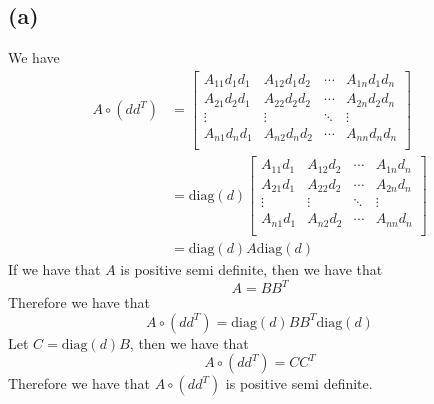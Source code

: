 \documentclass[11pt]{article}
\begin{document}
\subsection*{(a)}
We have 
\begin{align*}
    A \circ (dd^T) &= \begin{bmatrix}
        A_{11} d_1 d_1 & A_{12} d_1 d_2 & \cdots & A_{1n} d_1 d_n\\
        A_{21} d_2 d_1 & A_{22} d_2 d_2 & \cdots & A_{2n} d_2 d_n\\
        \vdots & \vdots & \ddots & \vdots\\
        A_{n1} d_n d_1 & A_{n2} d_n d_2 & \cdots & A_{nn} d_n d_n\\
    \end{bmatrix}\\
    & = \text{diag} (d) \begin{bmatrix}
        A_{11}d_1 & A_{12}d_2 & \cdots & A_{1n}d_n\\
        A_{21}d_1 & A_{22}d_2 & \cdots & A_{2n}d_n\\
        \vdots & \vdots & \ddots & \vdots\\
        A_{n1}d_1 & A_{n2}d_2 & \cdots & A_{nn}d_n\\
    \end{bmatrix}\\
    &= \text{diag} (d) A \text{diag}(d)
\end{align*}
If we have that $A$ is positive semi definite, then we have that 
$$A=BB^T$$
Therefore we have that 
$$A \circ (dd^T) = \text{diag} (d) BB^T \text{diag}(d)$$
Let $C = \text{diag} (d) B$, then we have that
$$A \circ (dd^T) = CC^T$$
Therefore we have that $A \circ (dd^T)$ is positive semi definite.
\end{document}
